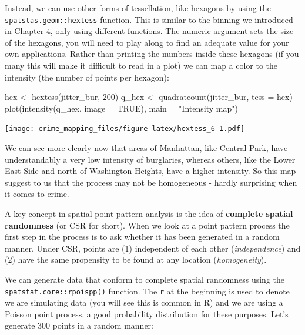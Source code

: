 \documentclass[
  krantz2]{krantz}
\makeatletter
\newenvironment{Shaded}{\begin{snugshade}}{\end{snugshade}}
\newcommand{\AttributeTok}[1]{\textcolor[rgb]{0.61,0.61,0.61}{#1}}
\newcommand{\ConstantTok}[1]{\textcolor[rgb]{0,0,0}{#1}}
\newcommand{\DecValTok}[1]{\textcolor[rgb]{0.06,0.06,0.06}{#1}}
\newcommand{\FunctionTok}[1]{\textcolor[rgb]{0,0,0}{#1}}
\newcommand{\NormalTok}[1]{#1}
\newcommand{\OtherTok}[1]{\textcolor[rgb]{0.37,0.37,0.37}{#1}}
\newcommand{\StringTok}[1]{\textcolor[rgb]{0.5,0.5,0.5}{#1}}
\newenvironment{kframe}{%
\medskip{}
\setlength{\fboxsep}{.8em}
 \def\at@end@of@kframe{}%
 \ifinner\ifhmode%
  \def\at@end@of@kframe{\end{minipage}}%
  \begin{minipage}{\columnwidth}%
 \fi\fi%
 \def\FrameCommand##1{\hskip\@totalleftmargin \hskip-\fboxsep
 \colorbox{shadecolor}{##1}\hskip-\fboxsep
     \hskip-\linewidth \hskip-\@totalleftmargin \hskip\columnwidth}%
 \MakeFramed {\advance\hsize-\width
   \@totalleftmargin\z@ \linewidth\hsize
   \@setminipage}}%
 {\par\unskip\endMakeFramed%
 \at@end@of@kframe}
\renewenvironment{Shaded}{\begin{kframe}}{\end{kframe}}
\makeatother
\begin{document}
Instead, we can use other forms of tessellation, like hexagons by using the \texttt{spatstas.geom::hextess} function. This is similar to the binning we introduced in Chapter 4, only using different functions. The numeric argument sets the size of the hexagons, you will need to play along to find an adequate value for your own applications. Rather than printing the numbers inside these hexagons (if you many this will make it difficult to read in a plot) we can map a color to the intensity (the number of points per hexagon):

\begin{Shaded}
\begin{Highlighting}[]
\NormalTok{hex }\OtherTok{\textless{}{-}} \FunctionTok{hextess}\NormalTok{(jitter\_bur, }\DecValTok{200}\NormalTok{)}
\NormalTok{q\_hex }\OtherTok{\textless{}{-}} \FunctionTok{quadratcount}\NormalTok{(jitter\_bur, }\AttributeTok{tess =}\NormalTok{ hex)}
\FunctionTok{plot}\NormalTok{(}\FunctionTok{intensity}\NormalTok{(q\_hex, }\AttributeTok{image =} \ConstantTok{TRUE}\NormalTok{), }\AttributeTok{main =} \StringTok{"Intensity map"}\NormalTok{)}
\end{Highlighting}
\end{Shaded}

\texttt{[image: crime\_mapping\_files/figure-latex/hextess\_6-1.pdf]}

We can see more clearly now that areas of Manhattan, like Central Park, have understandably a very low intensity of burglaries, whereas others, like the Lower East Side and north of Washington Heights, have a higher intensity. So this map suggest to us that the process may not be homogeneous - hardly surprising when it comes to crime.

A key concept in spatial point pattern analysis is the idea of \textbf{complete spatial randomness} (or CSR for short). When we look at a point pattern process the first step in the process is to ask whether it has been generated in a random manner. Under CSR, points are (1) independent of each other (\emph{independence}) and (2) have the same propensity to be found at any location (\emph{homogeneity}).

We can generate data that conform to complete spatial randomness using the \texttt{spatstat.core::rpoispp()} function. The \texttt{r} at the beginning is used to denote we are simulating data (you will see this is common in R) and we are using a Poisson point process, a good probability distribution for these purposes. Let's generate 300 points in a random manner:
\end{document}
